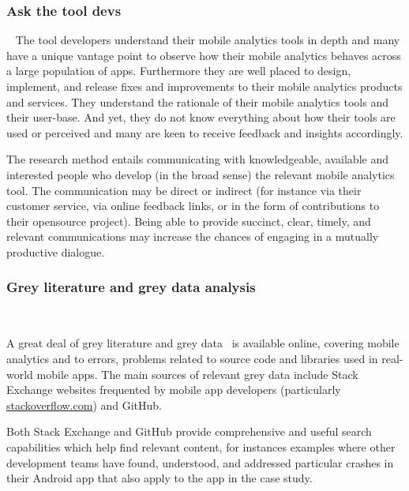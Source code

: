 \subsubsection{Ask the tool devs}~\label{section-ask-the-tool-devs-research-method}
The tool developers understand their mobile analytics tools in depth and many have a unique vantage point to observe how their mobile analytics behaves across a large population of apps. Furthermore they are well placed to design, implement, and release fixes and improvements to their mobile analytics products and services. They understand the rationale of their mobile analytics tools and their user-base. And yet, they do not know everything about how their tools are used or perceived and many are keen to receive feedback and insights accordingly.

The research method entails communicating with knowledgeable, available and interested people who develop (in the broad sense) the relevant mobile analytics tool. The communication may be direct or indirect (for instance via their customer service, via online feedback links, or in the form of contributions to their opensource project). Being able to provide succinct, clear, timely, and relevant communications may increase the chances of engaging in a mutually productive dialogue.

\subsubsection{Grey literature and grey data analysis}~\label{section-grey-literature-and-data-analysis-research-method} %

A great deal of grey literature and grey data~ is available online, covering mobile analytics and to errors, problems related to source code and libraries used in real-world mobile apps. The main sources of relevant grey data include Stack Exchange websites frequented by mobile app developers (particularly \href{https://stackoverflow.com/}{stackoverflow.com}) and GitHub. 

Both Stack Exchange and GitHub provide comprehensive and useful search capabilities which help find relevant content, for instances examples where other development teams have found, understood, and addressed particular crashes in their Android app that also apply to the app in the case study.

